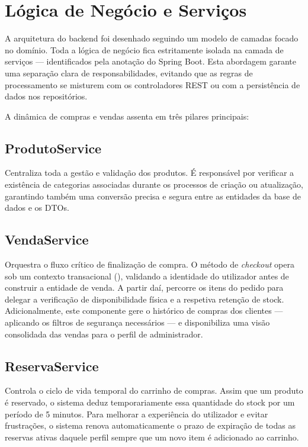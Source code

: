 \documentclass[11pt,a4paper,oneside]{report}
\begin{document}
\section{Lógica de Negócio e Serviços}
A arquitetura do backend foi desenhado seguindo um modelo de camadas focado no domínio. Toda a lógica de negócio fica estritamente isolada na camada de serviços --- identificados pela anotação  do Spring Boot. Esta abordagem garante uma separação clara de responsabilidades, evitando que as regras de processamento se misturem com os controladores REST ou com a persistência de dados nos repositórios.

A dinâmica de compras e vendas assenta em três pilares principais:

\subsection*{ProdutoService} 
Centraliza toda a gestão e validação dos produtos. É responsável por verificar a existência de categorias associadas durante os processos de criação ou atualização, garantindo também uma conversão precisa e segura entre as entidades da base de dados e os DTOs.

\subsection*{VendaService} 
Orquestra o fluxo crítico de finalização de compra. O método de \textit{checkout} opera sob um contexto transacional (), validando a identidade do utilizador antes de construir a entidade de venda. A partir daí, percorre os itens do pedido para delegar a verificação de disponibilidade física e a respetiva retenção de stock. Adicionalmente, este componente gere o histórico de compras dos clientes --- aplicando os filtros de segurança necessários --- e disponibiliza uma visão consolidada das vendas para o perfil de administrador.

\subsection*{ReservaService} 
Controla o ciclo de vida temporal do carrinho de compras. Assim que um produto é reservado, o sistema deduz temporariamente essa quantidade do stock por um período de 5 minutos. Para melhorar a experiência do utilizador e evitar frustrações, o sistema renova automaticamente o prazo de expiração de todas as reservas ativas daquele perfil sempre que um novo item é adicionado ao carrinho.
\end{document}
